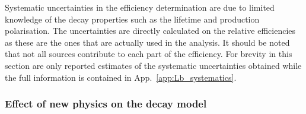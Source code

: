 %
Systematic uncertainties in the efficiency determination are due to limited knowledge
of the decay properties such as the \Lb lifetime and production polarisation.
The uncertainties are directly calculated on the relative efficiencies as these are the ones that
are actually used in the analysis. It should be noted that not all sources contribute to each part
of the efficiency. For brevity in this section are only reported estimates of the systematic
uncertainties obtained while the full information is contained in App.~\ref{app:Lb_systematics}.
%

\subsubsection{Effect of new physics on the decay model}
\label{sec:WCvariation}

